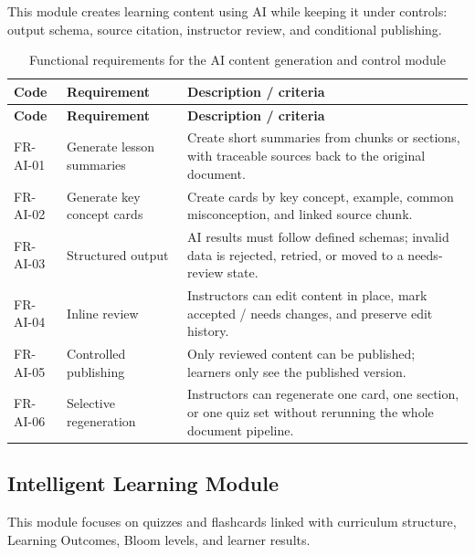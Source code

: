 This module creates learning content using AI while keeping it under controls:
output schema, source citation, instructor review, and conditional publishing.

\begin{longtable}{|p{2.4cm}|p{5.1cm}|p{6.9cm}|}
\caption{Functional requirements for the AI content generation and control module}
\label{tab:fr-sinh-noi-dung-ai}\\
\hline
\textbf{Code} & \textbf{Requirement} & \textbf{Description / criteria} \\
\hline
\endfirsthead
\hline
\textbf{Code} & \textbf{Requirement} & \textbf{Description / criteria} \\
\hline
\endhead
FR-AI-01 & Generate lesson summaries & Create short summaries from chunks or sections, with traceable sources back to the original document. \\
\hline
FR-AI-02 & Generate key concept cards & Create cards by key concept, example, common misconception, and linked source chunk. \\
\hline
FR-AI-03 & Structured output & AI results must follow defined schemas; invalid data is rejected, retried, or moved to a needs-review state. \\
\hline
FR-AI-04 & Inline review & Instructors can edit content in place, mark accepted / needs changes, and preserve edit history. \\
\hline
FR-AI-05 & Controlled publishing & Only reviewed content can be published; learners only see the published version. \\
\hline
FR-AI-06 & Selective regeneration & Instructors can regenerate one card, one section, or one quiz set without rerunning the whole document pipeline. \\
\hline
\end{longtable}

\subsection{Intelligent Learning Module}
\label{subsec:module-hoc-tap-thong-minh}

This module focuses on quizzes and flashcards linked with curriculum structure,
Learning Outcomes, Bloom levels, and learner results.

